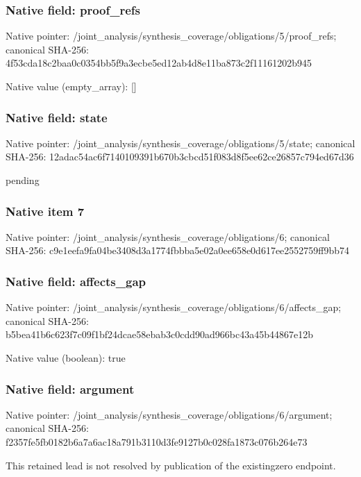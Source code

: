 \documentclass[10pt,a4paper]{article}
\begin{document}
\subsubsection{Native field: proof\_\allowbreak{}refs}
Native pointer: /joint\_\allowbreak{}analysis/synthesis\_\allowbreak{}coverage/obligations/5/proof\_\allowbreak{}refs; canonical SHA-256: 4f53cda18c2baa0c0354bb5f9a3ecbe5ed12ab4d8e11ba873c2f11161202b945

Native value (empty\_\allowbreak{}array): []

\subsubsection{Native field: state}
Native pointer: /joint\_\allowbreak{}analysis/synthesis\_\allowbreak{}coverage/obligations/5/state; canonical SHA-256: 12adac54ac6f7140109391b670b3cbcd51f083d8f5ee62ce26857c794ed67d36

\begingroup\raggedright\sloppy pending\par\endgroup

\subsubsection{Native item 7}
Native pointer: /joint\_\allowbreak{}analysis/synthesis\_\allowbreak{}coverage/obligations/6; canonical SHA-256: c9e1eefa9fa04be3408d3a1774fbbba5e02a0ee658e0d617ee2552759ff9bb74

\subsubsection{Native field: affects\_\allowbreak{}gap}
Native pointer: /joint\_\allowbreak{}analysis/synthesis\_\allowbreak{}coverage/obligations/6/affects\_\allowbreak{}gap; canonical SHA-256: b5bea41b6c623f7c09f1bf24dcae58ebab3c0cdd90ad966bc43a45b44867e12b

Native value (boolean): true

\subsubsection{Native field: argument}
Native pointer: /joint\_\allowbreak{}analysis/synthesis\_\allowbreak{}coverage/obligations/6/argument; canonical SHA-256: f2357fe5fb0182b6a7a6ac18a791b3110d3fe9127b0c028fa1873c076b264e73

\begingroup\raggedright\sloppy This retained lead is not resolved by publication of the existingzero endpoint.\par\endgroup
\end{document}
